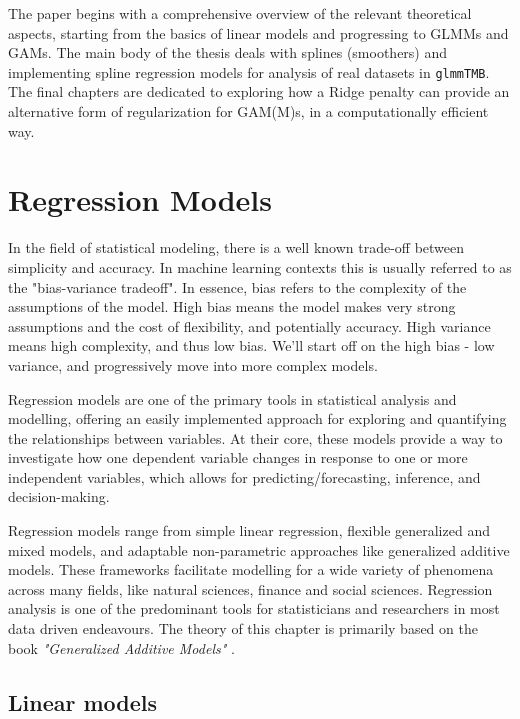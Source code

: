 \documentclass[12pt, twoside,hidelinks]{article}
\theoremstyle{definition}
\numberwithin{equation}{section}
\begin{document}
The paper begins with a comprehensive overview of the relevant theoretical aspects, starting from the basics of linear models and progressing to GLMMs and GAMs. The main body of the thesis deals with splines (smoothers) and implementing spline regression models for analysis of real datasets in \texttt{glmmTMB}. 
The final chapters are dedicated to exploring how a Ridge penalty can provide an alternative form of regularization for GAM(M)s, in a computationally efficient way.
\newpage

\section{Regression Models}\label{sec:regmod}

In the field of statistical modeling, there is a well known trade-off between simplicity and accuracy. In machine learning contexts this is usually referred to as the "bias-variance tradeoff". In essence, bias refers to the complexity of the assumptions of the model. High bias means the model makes very strong assumptions and the cost of flexibility, and potentially accuracy. High variance means high complexity, and thus low bias. We'll start off on the high bias - low variance, and progressively move into more complex models. 
\newline

Regression models are one of the primary tools in statistical analysis and modelling, offering an easily implemented approach for exploring and quantifying the relationships between variables. At their core, these models provide a way to investigate how one dependent variable changes in response to one or more independent variables, which allows for predicting/forecasting, inference, and decision-making. 
\newline

Regression models range from simple linear regression, flexible generalized and mixed models, and adaptable non-parametric approaches like generalized additive models. These frameworks facilitate modelling for a wide variety of phenomena across many fields, like natural sciences, finance and social sciences. Regression analysis is one of the predominant tools for statisticians and researchers in most data driven endeavours. The theory of this chapter is primarily based on the book \textit{"Generalized Additive Models"} \citet{wood2017}.

\subsection{Linear models}\label{sec:regmod:linmod}
\end{document}
